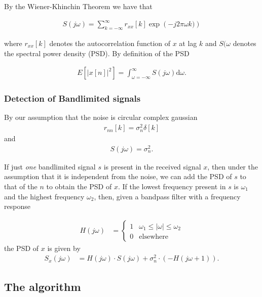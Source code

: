 \documentclass[a4paper, openany, oneside]{memoir}
\begin{document}
By the Wiener-Khinchin Theorem we have that 

 \begin{align*}
S(j\omega) = \sum_{k=-\infty}^{\infty} r_{xx}[k] \exp \left( -j2\pi \omega k) \right)
 \end{align*}

where $r_{xx}[k]$ denotes the autocorrelation function of $x$ at lag $k$ and $S(\omega$ denotes the spectral power density (PSD).
By definition of the PSD 

\begin{align*}
E\left[\left|x[n]\right|^2\right] = \int_{\omega = -\infty}^{\infty} S(j\omega)\text{d}\omega.
\end{align*}

\subsubsection{Detection of Bandlimited signals}
By our assumption that the noise is circular complex gaussian
\begin{align*}
    r_{nn}[k] = \sigma^2_n \delta[k]
\end{align*}
and 
\begin{align*}
    S(j\omega) = \sigma^2_n.
\end{align*}

If just \emph{one} bandlimited signal $s$ is present in the received signal $x$, then under the assumption that it is independent from the noise, we can add the PSD of $s$ to that of the $n$ to obtain the PSD of $x$. If the lowest frequency present in $s$ is $\omega_1$ and the highest frequency $\omega_2$, then, given a bandpass filter with a frequency response 

\begin{align*}
H(j\omega) &= \begin{cases}1 &\text{$\omega_1 \leq |\omega| \leq \omega_2$} \\
0 & \text{elsewhere} \end{cases} 
\end{align*}
the PSD of $x$ is given by
\begin{align}
S_x(j\omega) &= H(j\omega) \cdot S(j\omega) + \sigma_n^2 \cdot \left(-H(j\omega+1) \right).
\end{align}

\subsection{The algorithm}
\end{document}
